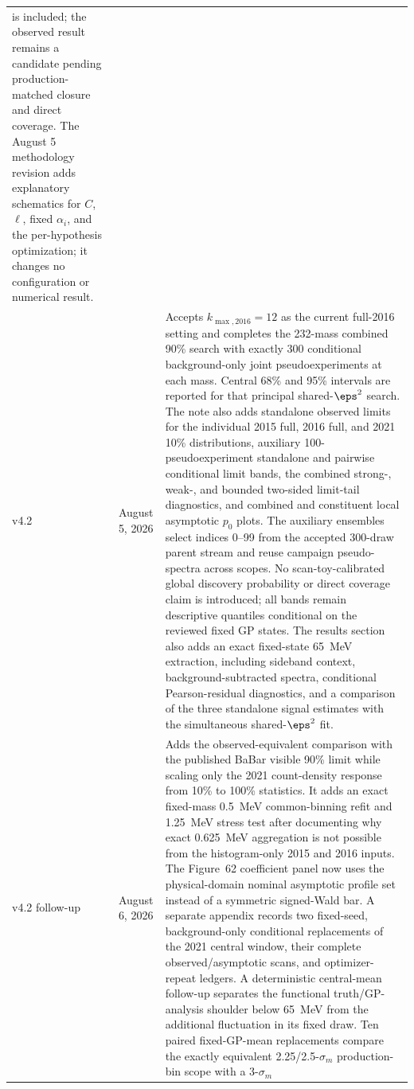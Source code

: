 \begin{longtable}{P{0.11\textwidth}P{0.16\textwidth}P{0.64\textwidth}}
is included; the observed result remains a candidate pending production-matched
closure and direct coverage. The August 5 methodology revision adds explanatory
schematics for $C$, $\ell$, fixed $\alpha_i$, and the per-hypothesis optimization;
it changes no configuration or numerical result. \\
\addlinespace
v4.2 & August 5, 2026 &
Accepts $k_{\max,2016}=12$ as the current full-2016 setting and completes the
232-mass combined 90\% \CLs{} search with exactly 300 conditional background-only
joint pseudoexperiments at each mass. Central 68\% and 95\% intervals are
reported for that principal shared-$\eps^2$ search. The note also adds
standalone observed limits for the individual 2015 full, 2016 full, and 2021
10\% distributions, auxiliary 100-pseudoexperiment standalone and pairwise
conditional limit bands, the combined strong-, weak-, and bounded two-sided
limit-tail diagnostics, and combined and constituent local asymptotic $p_0$
plots. The auxiliary ensembles select indices 0--99 from the accepted
300-draw parent stream and reuse campaign pseudo-spectra across scopes. No
scan-toy-calibrated global discovery probability or direct coverage claim is
introduced; all bands remain descriptive quantiles conditional on the reviewed
fixed GP states. The results section also
adds an exact fixed-state 65~MeV extraction, including sideband context,
background-subtracted spectra, conditional Pearson-residual diagnostics, and a
comparison of the three standalone signal estimates with the simultaneous
shared-$\eps^2$ fit. \\
\addlinespace
v4.2 follow-up & August 6, 2026 &
Adds the observed-equivalent comparison with the published BaBar visible
90\% limit while scaling only the 2021 count-density response from 10\% to
100\% statistics.  It adds an exact fixed-mass 0.5~MeV common-binning refit
and 1.25~MeV stress test after documenting why exact 0.625~MeV aggregation is
not possible from the histogram-only 2015 and 2016 inputs.  The Figure~62
coefficient panel now uses the physical-domain nominal asymptotic profile set
instead of a symmetric signed-Wald bar.  A separate appendix records two
fixed-seed, background-only conditional replacements of the 2021 central
window, their complete observed/asymptotic scans, and optimizer-repeat
ledgers.  A deterministic central-mean follow-up separates the functional
truth/GP-analysis shoulder below 65~MeV from the additional fluctuation in its
fixed draw.  Ten paired fixed-GP-mean replacements compare the exactly
equivalent 2.25/2.5-$\sigma_m$ production-bin scope with a 3-$\sigma_m$

\end{longtable}
